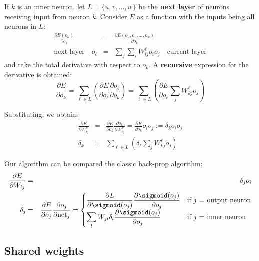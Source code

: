 If $k$ is an inner neuron, let $L = \{ u, v, \dots , w \}$ be the \textbf{next layer} of neurons receiving input from neuron $k$.  Consider $E$ as a function with the inputs being all neurons in $L$:
\begin{eqnarray}
\frac{\partial E(o_k)}{\partial o_k}
&=& \frac{\partial E(o_u, o_v, \dots, o_w)}{\partial o_k} \nonumber \\
\boxed{\mbox{next layer}} \quad
	o_{\ell} &=& \sum_j \sum_i W_{ij}^{\ell} o_i o_j
\quad \boxed{\mbox{current layer}}
\end{eqnarray}
and take the total derivative with respect to $o_k$.  A \textbf{recursive} expression for the derivative is obtained:
\begin{equation}
	\label{eqn:dE-do-k}
\frac{\partial E}{\partial o_k}
= \sum_{\ell \in L} \left( \frac{\partial E}{\partial o_{\ell}} \frac{\partial o_{\ell}}{\partial o_k} \right)
= \sum_{\ell \in L} \left( \frac{\partial E}{\partial o_{\ell}} \sum_j W_{kj}^{\ell} o_j \right)
\end{equation}

Substituting, we obtain:
\begin{eqnarray}
\frac{\partial E}{\partial W_{ij}^k}
&=& \frac{\partial E}{\partial o_k} \frac{\partial o_k}{\partial W_{ij}^k}
= \frac{\partial E}{\partial o_k} o_i o_j := \delta_k o_i o_j \nonumber \\ 
\delta_k &=& \sum_{\ell \in L} \left( \delta_{\ell} \sum_j W_{kj}^{\ell} o_j \right)
\end{eqnarray}

Our algorithm can be compared the classic back-prop algorithm:
\begin{eqnarray}
\frac{\partial E}{\partial W_{i j}} &=& \delta_j o_i \nonumber \\
\delta_j &=& \frac{\partial E}{\partial o_j} \frac{\partial o_j}{\partial \mathrm{net}_j} =
	\begin{cases}
	\displaystyle
	\frac{\partial L}{\partial \sigmoid(o_j)} \frac{\partial \sigmoid(o_j)}{\partial o_j} & \text{if $j$ = output neuron} \\
	\displaystyle
	\sum_l W_{j l} \delta_l \frac{\partial \sigmoid(o_j)}{\partial o_j} &  \text{if $j$ = inner neuron} 
	\end{cases}
\end{eqnarray}

\subsection{Shared weights}

